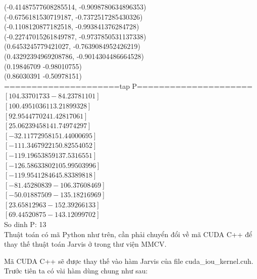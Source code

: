\documentclass[12pt,a4paper,openany,oneside]{report}
\begin{document}
(-0.41487577608285514, -0.9098780634896353)\\
(-0.6756181530719187, -0.7372517285430326)\\
(-0.1108120877182518, -0.993841376284728)\\
(-0.22747015261849787, -0.9737850531137338)\\
(0.6453245779421027, -0.7639084952426219)\\
(0.43292394969208786, -0.9014304486664528)\\
(0.19846709 -0.98010755)\\
(0.86030391 -0.50978151)\\
=====================tap P=====================\\
$\left[104.33701733 -84.23781101\right]$\\
$\left[100.49510361  13.21899328\right]$\\
$\left[92.95447702 41.42817061\right]$\\
$\left[ 25.06239458 141.74974297\right]$\\
$\left[-32.11772958 151.44000695\right]$\\
$\left[-111.3467922   150.82554052\right]$\\
$\left[-119.19653859  137.5316551 \right]$\\
$\left[-126.58633802  105.99503996\right]$\\
$\left[-119.95412846   45.83389818\right]$\\
$\left[ -81.45280839 -106.37608469\right]$\\
$\left[ -50.01887509 -135.18216969\right]$\\
$\left[  23.65812963 -152.39266133\right]$\\
$\left[  69.44520875 -143.12099702\right]$\\
So dinh P:  13\\


Thuật toán có mã Python như trên, cần phải chuyển đổi về mã CUDA C++ để thay thế thuật toán Jarvis ở trong thư viện MMCV. 

Mã CUDA C++ sẽ được thay thế vào hàm Jarvis của file cuda\_iou\_kernel.cuh. Trước tiên ta có vài hàm dùng chung như sau:
\end{document}
